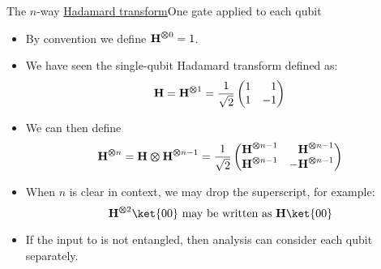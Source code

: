 \begin{frame}{The $n$-way \href{https://en.wikipedia.org/wiki/Hadamard_transform}{Hadamard transform}}{One \Hadamard{} gate applied to each qubit}

\begin{itemize}[<+->]
    \item By convention we define $\mbox{\bfseries{\textrm{H}}}^{\bm{\otimes} 0}=1$.
    \item We have seen the single-qubit Hadamard transform \Hadamard{} defined as:
    \[
        \Hadamard = \TensSupProd{\Hadamard}{1} = \HMatrix{}
    \]
    \item We can then define
    \Vskip{-1.5em}\[  \TensSupProd{\Hadamard}{n} = \TensProd{\Hadamard}{\TensSupProd{\Hadamard}{n-1}} = \SQBG{\RootTwo}{\TensSupProd{\Hadamard}{n-1}}{\TensSupProd{\Hadamard}{n-1}}{\TensSupProd{\Hadamard}{n-1}}{-\TensSupProd{\Hadamard}{n-1}}
    \]
    \item When $n$ is clear in context, we may drop the superscript, for example:
    \[
       \TensSupProd{\Hadamard}{2} \ket{00} \mbox{ may be written as }
       \Hadamard \ket{00}
    \]
    \item If the input to  is not entangled, then analysis can consider each qubit separately.
\end{itemize}
    
\end{frame}

